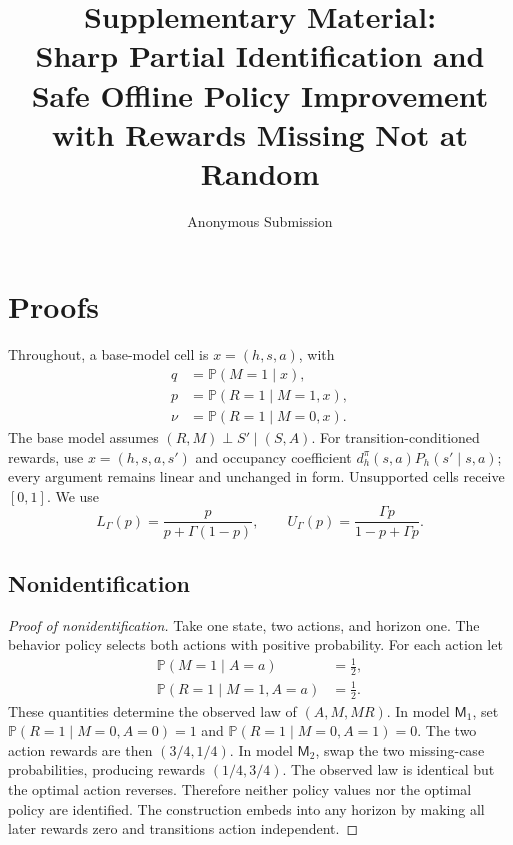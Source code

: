 \documentclass[letterpaper]{article}
\title{Supplementary Material:\\Sharp Partial Identification and Safe Offline Policy Improvement\\with Rewards Missing Not at Random}
\author{Anonymous Submission}
\newcommand{\Prb}{\mathbb{P}}
\begin{document}
\maketitle

\section{Proofs}
Throughout, a base-model cell is $x=(h,s,a)$, with
\begin{align*}
q&=\Prb(M=1\mid x),\\
p&=\Prb(R=1\mid M=1,x),\\
\nu&=\Prb(R=1\mid M=0,x).
\end{align*}
The base model assumes $(R,M)\perp S'\mid(S,A)$. For transition-conditioned rewards, use $x=(h,s,a,s')$ and occupancy coefficient $d_h^\pi(s,a)P_h(s'\mid s,a)$; every argument remains linear and unchanged in form. Unsupported cells receive $[0,1]$. We use
\[
L_\Gamma(p)=\frac{p}{p+\Gamma(1-p)},\qquad
U_\Gamma(p)=\frac{\Gamma p}{1-p+\Gamma p}.
\]

\subsection{Nonidentification}
\begin{proof}[Proof of nonidentification]
Take one state, two actions, and horizon one. The behavior policy selects both actions with positive probability. For each action let
\begin{align*}
\Prb(M=1\mid A=a)&=\tfrac12,\\
\Prb(R=1\mid M=1,A=a)&=\tfrac12.
\end{align*}
These quantities determine the observed law of $(A,M,MR)$. In model $\mathsf M_1$, set
$\Prb(R=1\mid M=0,A=0)=1$ and
$\Prb(R=1\mid M=0,A=1)=0$.
The two action rewards are then $(3/4,1/4)$. In model $\mathsf M_2$, swap the two missing-case probabilities, producing rewards $(1/4,3/4)$. The observed law is identical but the optimal action reverses. Therefore neither policy values nor the optimal policy are identified. The construction embeds into any horizon by making all later rewards zero and transitions action independent.
\end{proof}
\end{document}
